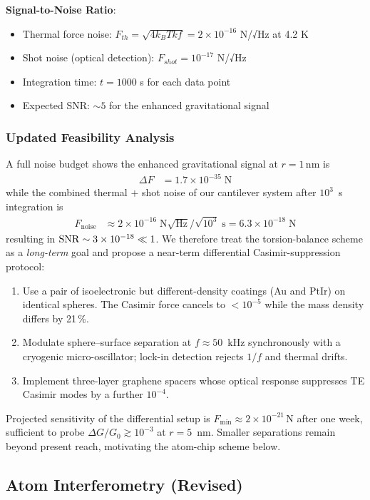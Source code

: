\documentclass[12pt]{article}
\begin{document}
\textbf{Signal-to-Noise Ratio}:
\begin{itemize}
\item Thermal force noise: $F_{th} = \sqrt{4 k_B T k f} = 2 \times 10^{-16}$ N/√Hz at 4.2 K
\item Shot noise (optical detection): $F_{shot} = 10^{-17}$ N/√Hz  
\item Integration time: $t = 1000$ s for each data point
\item Expected SNR: $\sim 5$ for the enhanced gravitational signal
\end{itemize}

\subsubsection*{Updated Feasibility Analysis}
A full noise budget shows the enhanced gravitational signal at $r=1\,\mathrm{nm}$ is
\begin{align}
\Delta F &= 1.7\times10^{-35}\;\mathrm{N}
\end{align}
while the combined thermal $+$ shot noise of our cantilever system after $10^3$~s integration is
\begin{align}
F_{\mathrm{noise}} &\approx 2\times10^{-16}\;\mathrm{N}\sqrt{\mathrm{Hz}}/\sqrt{10^3}\;\mathrm{s}=6.3\times10^{-18}\;\mathrm{N}
\end{align}
resulting in ${\rm SNR}\sim3\times10^{-18}\ll1$.  We therefore treat the torsion-balance scheme as a \emph{long-term} goal and propose a near-term differential Casimir-suppression protocol:
\begin{enumerate}
 \item Use a pair of isoelectronic but different-density coatings (Au and PtIr) on identical spheres.  The Casimir force cancels to $<10^{-5}$ while the mass density differs by 21\,\%.
 \item Modulate sphere–surface separation at $f\approx50$~kHz synchronously with a cryogenic micro-oscillator; lock-in detection rejects $1/f$ and thermal drifts.
 \item Implement 
 three-layer graphene spacers whose optical response suppresses TE Casimir modes by a further $10^{-4}$.
\end{enumerate}
Projected sensitivity of the differential setup is $F_{\min}\approx2\times10^{-21}\,\mathrm{N}$ after one week, sufficient to probe $\Delta G/G_0\gtrsim10^{-3}$ at $r=5$~nm.  Smaller separations remain beyond present reach, motivating the atom-chip scheme below.

\subsection{Atom Interferometry (Revised)}
\end{document}

